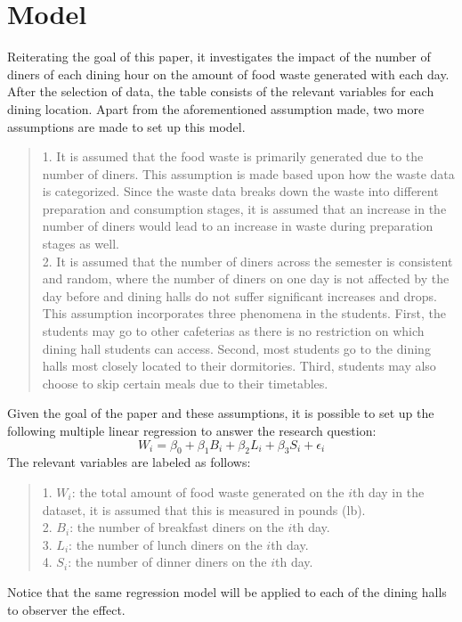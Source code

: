 \section{Model}
Reiterating the goal of this paper, it investigates the impact of the number of diners of each dining hour on the amount of food waste generated with each day. After the selection of data, the table consists of the relevant variables for each dining location. Apart from the aforementioned assumption made, two more assumptions are made to set up this model.
\begin{quote}
    1. It is assumed that the food waste is primarily generated due to the number of diners. This assumption is made based upon how the waste data is categorized. Since the waste data breaks down the waste into different preparation and consumption stages, it is assumed that an increase in the number of diners would lead to an increase in waste during preparation stages as well. \\
    2. It is assumed that the number of diners across the semester is consistent and random, where the number of diners on one day is not affected by the day before and dining halls do not suffer significant increases and drops. This assumption incorporates three phenomena in the students. First, the students may go to other cafeterias as there is no restriction on which dining hall students can access. Second, most students go to the dining halls most closely located to their dormitories. Third, students may also choose to skip certain meals due to their timetables.
\end{quote}
Given the goal of the paper and these assumptions, it is possible to set up the following multiple linear regression to answer the research question:
$$W_i = \beta_0 + \beta_1 B_i + \beta_2 L_i + \beta_3 S_i + \epsilon_i$$
The relevant variables are labeled as follows:
\begin{quote}
    1. $W_i$: the total amount of food waste generated on the $i$th day in the dataset, it is assumed that this is measured in pounds (lb). \\
    2. $B_i$: the number of breakfast diners on the $i$th day. \\
    3. $L_i$: the number of lunch diners on the $i$th day. \\
    4. $S_i$: the number of dinner diners on the $i$th day.
\end{quote}
Notice that the same regression model will be applied to each of the dining halls to observer the effect.

